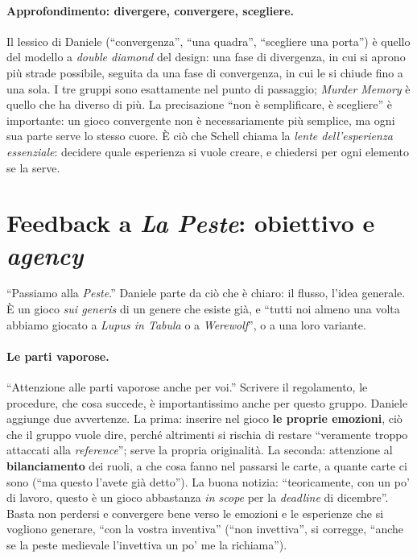 \paragraph{Approfondimento: divergere, convergere, scegliere.} Il lessico di Daniele
(``convergenza'', ``una quadra'', ``scegliere una porta'') è quello del modello a
\emph{double diamond} del design: una fase di divergenza, in cui si aprono più strade
possibile, seguita da una fase di convergenza, in cui le si chiude fino a una sola. I tre
gruppi sono esattamente nel punto di passaggio; \emph{Murder Memory} è quello che ha
diverso di più. La precisazione ``non è semplificare, è scegliere'' è importante: un
gioco convergente non è necessariamente più semplice, ma ogni sua parte serve lo stesso
cuore. È ciò che Schell chiama la \emph{lente dell'esperienza essenziale}: decidere quale
esperienza si vuole creare, e chiedersi per ogni elemento se la serve.

\section{Feedback a \emph{La Peste}: obiettivo e \emph{agency}}
\label{a11:sec:fbpeste}

``Passiamo alla \emph{Peste}.'' Daniele parte da ciò che è chiaro: il flusso, l'idea
generale. È un gioco \emph{sui generis} di un genere che esiste già, e ``tutti noi almeno
una volta abbiamo giocato a \emph{Lupus in Tabula} o a \emph{Werewolf}'', o a una loro
variante.

\paragraph{Le parti vaporose.} ``Attenzione alle parti vaporose anche per voi.''
Scrivere il regolamento, le procedure, che cosa succede, è importantissimo anche per
questo gruppo. Daniele aggiunge due avvertenze. La prima: inserire nel gioco \textbf{le
proprie emozioni}, ciò che il gruppo vuole dire, perché altrimenti si rischia di
restare ``veramente troppo attaccati alla \emph{reference}''; serve la propria
originalità. La seconda: attenzione al \textbf{bilanciamento} dei ruoli, a che cosa fanno
nel passarsi le carte, a quante carte ci sono (``ma questo l'avete già detto''). La
buona notizia: ``teoricamente, con un po' di lavoro, questo è un gioco abbastanza
\emph{in scope} per la \emph{deadline} di dicembre''. Basta non perdersi e convergere
bene verso le emozioni e le esperienze che si vogliono generare, ``con la vostra
inventiva'' (``non invettiva'', si corregge, ``anche se la peste medievale l'invettiva un
po' me la richiama'').

